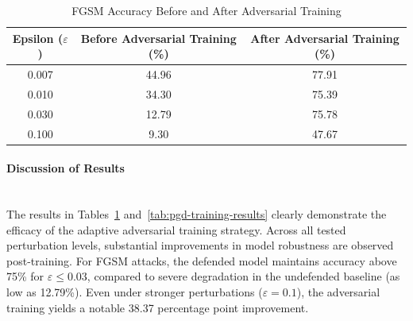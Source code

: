 \documentclass[../main.tex]{subfiles}
\begin{document}
\begin{table}[H]
\centering
\caption{FGSM Accuracy Before and After Adversarial Training}
\begin{tabular}{ccc}
\toprule
\textbf{Epsilon ($\varepsilon$)} & \textbf{Before Adversarial Training (\%)} & \textbf{After Adversarial Training (\%)} \\
\midrule
0.007 & 44.96 & 77.91 \\
0.010 & 34.30 & 75.39 \\
0.030 & 12.79 & 75.78 \\
0.100 & 9.30  & 47.67 \\
\bottomrule
\end{tabular}
\label{tab:fgsm-training-results}
\end{table}
\begin{table}[H]
\caption{PGD Accuracy Before and After Adversarial Training}
\hspace*{-1cm}%
\label{tab:pgd-training-results}
\end{table}
\paragraph{Discussion of Results}\mbox{}\\[1ex]
The results in Tables~\ref{tab:fgsm-training-results} and~\ref{tab:pgd-training-results} clearly demonstrate the efficacy of the adaptive adversarial training strategy. Across all tested perturbation levels, substantial improvements in model robustness are observed post-training. For FGSM attacks, the defended model maintains accuracy above 75\% for $\varepsilon \leq 0.03$, compared to severe degradation in the undefended baseline (as low as 12.79\%). Even under stronger perturbations ($\varepsilon = 0.1$), the adversarial training yields a notable 38.37 percentage point improvement.
\end{document}

